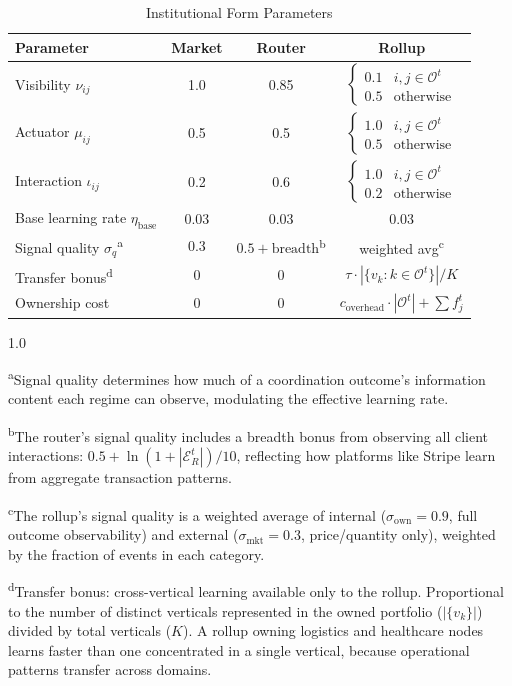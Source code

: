 \documentclass[12pt]{article}
\theoremstyle{definition}
\begin{document}
\begin{table}[H]
\centering
\caption{Institutional Form Parameters}
\label{tab:params}
\begin{tabular}{lccc}
\toprule
Parameter & Market & Router & Rollup \\
\midrule
Visibility $\nu_{ij}$ & 1.0 & 0.85 & $\begin{cases} 0.1 & i,j \in \mathcal{O}^t \\ 0.5 & \text{otherwise} \end{cases}$ \\[8pt]
Actuator $\mu_{ij}$ & 0.5 & 0.5 & $\begin{cases} 1.0 & i,j \in \mathcal{O}^t \\ 0.5 & \text{otherwise} \end{cases}$ \\[8pt]
Interaction $\iota_{ij}$ & 0.2 & 0.6 & $\begin{cases} 1.0 & i,j \in \mathcal{O}^t \\ 0.2 & \text{otherwise} \end{cases}$ \\[8pt]
Base learning rate $\eta_{\text{base}}$ & 0.03 & 0.03 & 0.03 \\
Signal quality $\sigma_q$\textsuperscript{a} & 0.3 & $0.5 + \text{breadth}$\textsuperscript{b} & weighted avg\textsuperscript{c} \\
Transfer bonus\textsuperscript{d} & 0 & 0 & $\tau \cdot |\{v_k : k \in \mathcal{O}^t\}| / K$ \\
Ownership cost & 0 & 0 & $c_{\text{overhead}} \cdot |\mathcal{O}^t| + \sum f_j^t$ \\
\bottomrule
\end{tabular}

\vspace{4pt}
\begin{spacing}{1.0}
{\small
\textsuperscript{a}Signal quality determines how much of a coordination outcome's information content each regime can observe, modulating the effective learning rate.

\textsuperscript{b}The router's signal quality includes a breadth bonus from observing all client interactions: $0.5 + \ln(1 + |\mathcal{E}^t_R|)/10$, reflecting how platforms like Stripe learn from aggregate transaction patterns.

\textsuperscript{c}The rollup's signal quality is a weighted average of internal ($\sigma_{\text{own}} = 0.9$, full outcome observability) and external ($\sigma_{\text{mkt}} = 0.3$, price/quantity only), weighted by the fraction of events in each category.

\textsuperscript{d}Transfer bonus: cross-vertical learning available only to the rollup. Proportional to the number of distinct verticals represented in the owned portfolio ($|\{v_k\}|$) divided by total verticals ($K$). A rollup owning logistics and healthcare nodes learns faster than one concentrated in a single vertical, because operational patterns transfer across domains.
}
\end{spacing}
\end{table}
\end{document}
